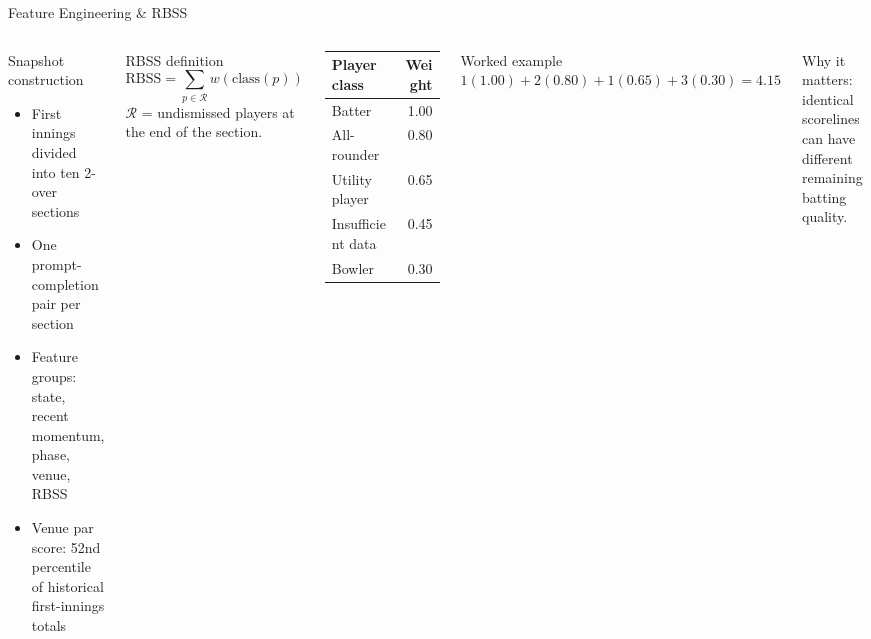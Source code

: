 \documentclass[aspectratio=169,10pt]{beamer}
\begin{document}
\begin{frame}{Feature Engineering \& RBSS}
\scriptsize
\begin{columns}[T,onlytextwidth]
  \begin{block}{Snapshot construction}
    \begin{itemize}
      \item First innings divided into ten 2-over sections
      \item One prompt-completion pair per section
      \item Feature groups: state, recent momentum, phase, venue, RBSS
      \item Venue par score: 52nd percentile of historical first-innings totals
    \end{itemize}
  \end{block}

  \begin{block}{RBSS definition}
    \[
      \text{RBSS}=\sum_{p\in \mathcal{R}} w(\text{class}(p))
    \]
    $\mathcal{R}$ = undismissed players at the end of the section.
  \end{block}

  \renewcommand{\arraystretch}{1.15}
  \begin{tabularx}{\textwidth}{@{}Xr@{}}
  \toprule
  \textbf{Player class} & \textbf{Weight} \\
  \midrule
  Batter & 1.00 \\
  All-rounder & 0.80 \\
  Utility player & 0.65 \\
  Insufficient data & 0.45 \\
  Bowler & 0.30 \\
  \bottomrule
  \end{tabularx}

  \vspace{0.35cm}
  \begin{block}{Worked example}
  \centering
  $1(1.00)+2(0.80)+1(0.65)+3(0.30)=\mathbf{4.15}$
  \end{block}

  \vspace{0.15cm}
  \alert{Why it matters:} identical scorelines can have different remaining batting quality.
\end{columns}
\end{frame}
\end{document}
